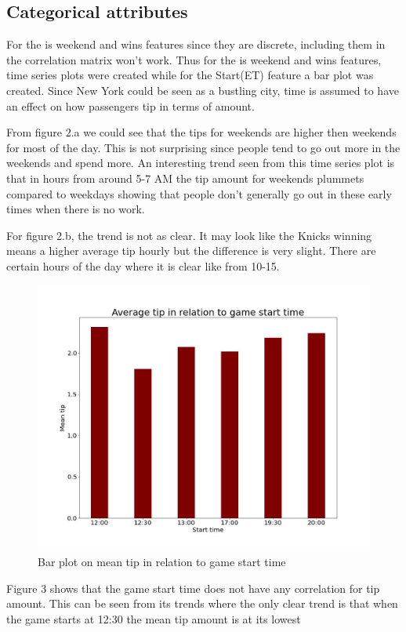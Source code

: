 \documentclass[11pt]{article}
\begin{document}
\subsection{Categorical attributes}
For the is weekend and wins features since they are discrete, including them in the correlation matrix won't work. Thus for the is weekend and wins features, time series plots were created while for the Start(ET) feature a bar plot was created. Since New York could be seen as a bustling city, time is assumed to have an effect on how passengers tip in terms of amount. 

From figure 2.a we could see that the tips for weekends are higher then weekends for most of the day. This is not surprising since people tend to go out more in the weekends and spend more. An interesting trend seen from this time series plot is that in hours from around 5-7 AM the tip amount for weekends plummets compared to weekdays showing that people don't generally go out in these early times when there is no work.

For figure 2.b, the trend is not as clear. It may look like the Knicks winning means a higher average tip hourly but the difference is very slight. There are certain hours of 
the day where it is clear like from 10-15.

\begin{figure}[h]
    \includegraphics[height = 8 cm , width = 13 cm]{plots/bar_plot_gamestart.jpeg}
    \centering
    \caption{Bar plot on mean tip in relation to game start time} %
\end{figure}
Figure 3 shows that the game start time does not have any correlation for tip amount. This can be seen from its trends where the only clear trend is that when the game starts at 12:30 the mean tip amount is at its lowest
\end{document}
